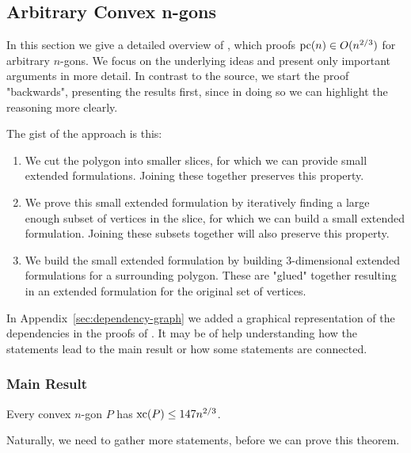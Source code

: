 \subsection{Arbitrary Convex n-gons}

In this section we give a detailed overview of \cite{shitov2020sublinear}, which proofs $\operatorname{pc}(n) \in O(n^{2/3})$ for arbitrary $n$-gons. 
We focus on the underlying ideas and present only important arguments in more detail. In contrast to the source, we start the proof "backwards", presenting  the results first, since in doing so we can highlight the reasoning more clearly.

The gist of the approach is this: 
\begin{enumerate}
  \item We cut the polygon into smaller slices, for which we can provide small extended formulations. Joining these together preserves this property.
  \item We prove this small extended formulation by iteratively finding a large enough subset of vertices in the slice, for which we can build a small extended formulation. Joining these subsets together will also preserve this property.
  \item We build the small extended formulation by building 3-dimensional extended formulations for a surrounding polygon. These are "glued" together resulting in an extended formulation for the original set of vertices.
\end{enumerate}

In Appendix~\ref{sec:dependency-graph} we added a graphical representation of the dependencies in the proofs of \cite{shitov2014sublinear}. It may be of help understanding how the statements lead to the main result or how some statements are connected.



\subsubsection{Main Result}

\begin{theorem}\label{theorem:xc}
  Every convex $n$-gon $P$ has $\operatorname{xc}(P) \leq 147 n^{2/3}$.
\end{theorem}

Naturally, we need to gather more statements, before we can prove this theorem. 

